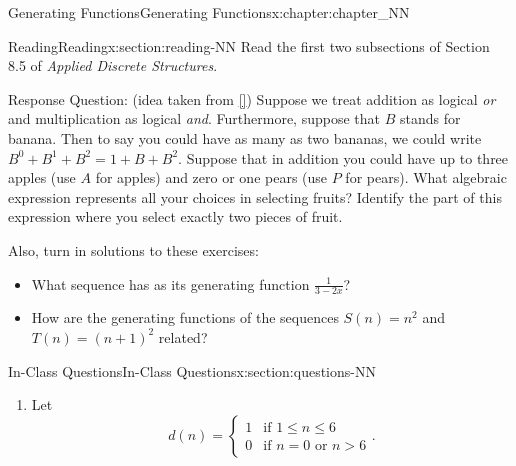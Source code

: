 \documentclass[oneside,10pt,]{book}
\newcommand{\xreffont}{\relax}
\numberwithin{equation}{section}
\newcommand{\gt}{>}
\begin{document}
%
%
\typeout{************************************************}
\typeout{************************************************}
%
\begin{chapterptx}{Generating Functions}{}{Generating Functions}{}{}{x:chapter:chapter_NN}
\index{}%
%
%
\typeout{************************************************}
\typeout{************************************************}
%
\begin{sectionptx}{Reading}{}{Reading}{}{}{x:section:reading-NN}
Read the first two subsections of Section 8.5 of \emph{Applied Discrete Structures}.%
\par
Response Question: (idea taken from \hyperlink{x:biblio:biblio-bogart-2017}{[{\xreffont 1}]}) Suppose we treat addition as logical \emph{or} and multiplication as logical \emph{and}.  Furthermore, suppose that \(B\) stands for banana.  Then to say you could have as many as two bananas, we could write \(B^0+B^1+B^2=1+B+B^2\).  Suppose that in addition you could have up to three apples (use \(A\) for apples) and zero or one pears (use \(P\) for pears).  What algebraic expression represents all your choices in selecting fruits?  Identify the part of this expression where you select exactly two pieces of fruit.%
\par
Also, turn in solutions to these exercises:%
\begin{itemize}[label=\textbullet]
\item{}What sequence has as its generating function \(\frac{1}{3-2x}\)?%
\item{}How are the generating functions of the sequences \(S(n)=n^2\) and \(T(n)=(n+1)^2\) related?%
\end{itemize}
%
\end{sectionptx}
%
%
\typeout{************************************************}
\typeout{************************************************}
%
\begin{sectionptx}{In-Class Questions}{}{In-Class Questions}{}{}{x:section:questions-NN}
%
\begin{enumerate}[label=\arabic*.]
\item{}Let%
\begin{equation*}
d(n)=
\begin{cases}
1 & \textrm{if }1 \leq n \leq 6\\
0 & \textrm{if }n=0\textrm{ or }n \gt 6
\end{cases}.
\end{equation*}

\end{enumerate}
\end{sectionptx}
\end{chapterptx}
\end{document}
